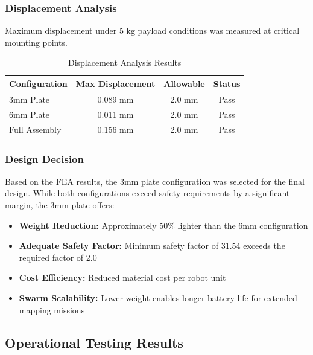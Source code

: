 \subsubsection{Displacement Analysis}

Maximum displacement under 5 kg payload conditions was measured at critical mounting points.

\begin{table}[H]
\centering
\caption{Displacement Analysis Results}
\label{tab:displacement_results}
\begin{tabular}{|l|c|c|c|}
\hline
\textbf{Configuration} & \textbf{Max Displacement} & \textbf{Allowable} & \textbf{Status} \\
\hline
3mm Plate & 0.089 mm & 2.0 mm & Pass \\
6mm Plate & 0.011 mm & 2.0 mm & Pass \\
Full Assembly & 0.156 mm & 2.0 mm & Pass \\
\hline
\end{tabular}
\end{table}

\subsubsection{Design Decision}

Based on the FEA results, the 3mm plate configuration was selected for the final design. While both configurations exceed safety requirements by a significant margin, the 3mm plate offers:
\begin{itemize}
    \item \textbf{Weight Reduction:} Approximately 50\% lighter than the 6mm configuration
    \item \textbf{Adequate Safety Factor:} Minimum safety factor of 31.54 exceeds the required factor of 2.0
    \item \textbf{Cost Efficiency:} Reduced material cost per robot unit
    \item \textbf{Swarm Scalability:} Lower weight enables longer battery life for extended mapping missions
\end{itemize}

\subsection{Operational Testing Results}


